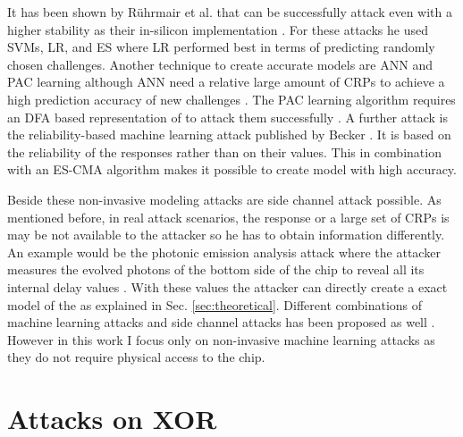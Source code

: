 It has been shown by Rührmair et al. that \apufs can be successfully attack even with a higher stability as their in-silicon implementation \cite{Ruhrmair2010ModelingFunctions}.
For these attacks he used \acp{SVM}, \ac{LR}, and \ac{ES} where \ac{LR} performed best in terms of predicting randomly chosen challenges.
Another technique to create accurate \apuf models are \ac{ANN} and \ac{PAC} learning although \ac{ANN} need a relative large amount of \acp{CRP} to achieve a high prediction accuracy of new challenges \cite{Hospodar2012MachineUsability}.
The \ac{PAC} learning algorithm requires an \ac{DFA} based representation of \apufs to attack them successfully \cite{Ganji2016PACPUFs}.
A further attack is the reliability-based machine learning attack published by Becker \cite{Becker2015ThePUFs}.
It is based on the reliability of the \puf responses rather than on their values. 
This in combination with an \ac{ES-CMA} algorithm makes it possible to create \apuf model with high accuracy.

Beside these non-invasive modeling attacks are side channel attack possible.
As mentioned before, in real attack scenarios, the \puf response or a large set of \acp{CRP} is may be not available to the attacker so he has to obtain information differently.
An example would be the photonic emission analysis attack where the attacker measures the evolved photons of the bottom side of the \apuf chip to reveal all its internal delay values \cite{Tajik2014PhysicalPUFs}.
With these values the attacker can directly create a exact model of the \apuf as explained in Sec. \ref{sec:theoretical}.
Different combinations of machine learning attacks and side channel attacks has been proposed as well \cite{Mahmoud2013CombinedPUFs} \cite{Xu2014Hybrid}.
However in this work I focus only on non-invasive machine learning attacks as they do not require physical access to the \apuf chip.


\section{Attacks on \acs{XOR} \apufs}
\label{sec:attacksonxorarbiter}


